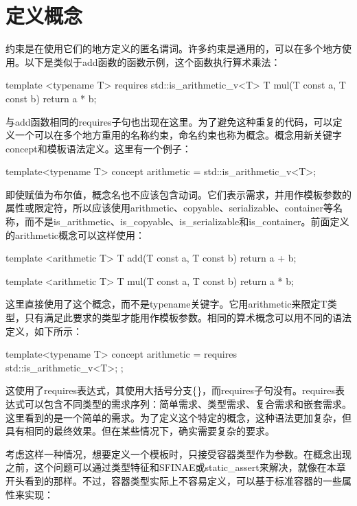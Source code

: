 \section{定义概念}
约束是在使用它们的地方定义的匿名谓词。许多约束是通用的，可以在多个地方使用。以下是类似于add函数的函数示例，这个函数执行算术乘法：

\begin{cpp}
template <typename T>
requires std::is_arithmetic_v<T>
T mul(T const a, T const b)
{
	return a * b;
}
\end{cpp}

与add函数相同的requires子句也出现在这里。为了避免这种重复的代码，可以定义一个可以在多个地方重用的名称约束，命名约束也称为概念。概念用新关键字concept和模板语法定义。这里有一个例子：

\begin{cpp}
template<typename T>
concept arithmetic = std::is_arithmetic_v<T>;
\end{cpp}

即使赋值为布尔值，概念名也不应该包含动词。它们表示需求，并用作模板参数的属性或限定符，所以应该使用arithmetic、copyable、serializable、container等名称，而不是is\_arithmetic、is\_copyable、is\_serializable和is\_container。前面定义的arithmetic概念可以这样使用：

\begin{cpp}
template <arithmetic T>
T add(T const a, T const b) { return a + b; }

template <arithmetic T>
T mul(T const a, T const b) { return a * b; }
\end{cpp}

这里直接使用了这个概念，而不是typename关键字。它用arithmetic来限定T类型，只有满足此要求的类型才能用作模板参数。相同的算术概念可以用不同的语法定义，如下所示：

\begin{cpp}
template<typename T>
concept arithmetic = requires { std::is_arithmetic_v<T>; };
\end{cpp}

这使用了requires表达式，其使用大括号分支\{\}，而requires子句没有。requires表达式可以包含不同类型的需求序列：简单需求、类型需求、复合需求和嵌套需求。这里看到的是一个简单的需求。为了定义这个特定的概念，这种语法更加复杂，但具有相同的最终效果。但在某些情况下，确实需要复杂的要求。

考虑这样一种情况，想要定义一个模板时，只接受容器类型作为参数。在概念出现之前，这个问题可以通过类型特征和SFINAE或static\_assert来解决，就像在本章开头看到的那样。不过，容器类型实际上不容易定义，可以基于标准容器的一些属性来实现：

